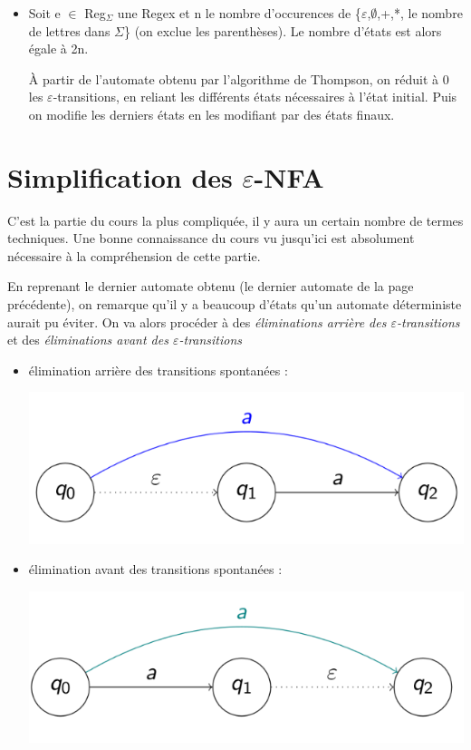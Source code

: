 \documentclass{article}
\begin{document}
\begin{itemize}
    \item Soit e $\in$ Reg$_{\Sigma}$ une Regex et n le nombre d'occurences de \{$\varepsilon$,$\emptyset$,+,*, le nombre de lettres dans $\Sigma$\} (on exclue les parenthèses). Le nombre d'états est alors égale à 2n.

À partir de l'automate obtenu par l'algorithme de Thompson, on réduit à 0 les $\varepsilon$-transitions, en reliant les différents états nécessaires à l'état initial. Puis on modifie les derniers états en les modifiant par des états finaux.
\end{itemize}\newpage
\section{Simplification des $\varepsilon$-NFA}
C'est la partie du cours la plus compliquée, il y aura un certain nombre de termes techniques. Une bonne connaissance du cours vu jusqu'ici est absolument nécessaire à la compréhension de cette partie.\par
En reprenant le dernier automate obtenu (le dernier automate de la page précédente), on remarque qu'il y a beaucoup d'états qu'un automate déterministe aurait pu éviter. On va alors procéder à des \textit{éliminations arrière des $\varepsilon$-transitions} et des \textit{éliminations avant des $\varepsilon$-transitions}
\begin{itemize}
    \item élimination arrière des transitions spontanées :
    \begin{center}
        \includegraphics[scale=0.3]{Image9.png}
    \end{center}    
    \item élimination avant des transitions spontanées :
    \begin{center}
        \includegraphics[scale=0.3]{Image10.png}
    \end{center}
\end{itemize}
\end{document}
